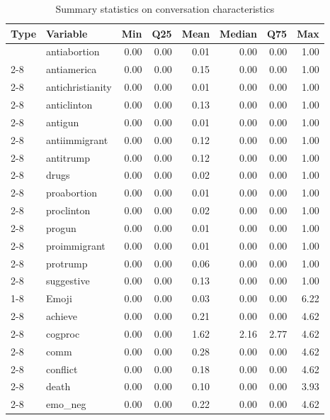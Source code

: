 \documentclass{article}
\begin{document}
\begin{table}[h]
\centering
\caption{\label{tab:summ-tab2}Summary statistics on conversation characteristics}
\centering
\begin{tabular}[t]{l|l|r|r|r|r|r|r}
\hline
Type & Variable & Min & Q25 & Mean & Median & Q75 & Max\\
\hline
 & antiabortion & 0.00 & 0.00 & 0.01 & 0.00 & 0.00 & 1.00\\
\cline{2-8}
 & antiamerica & 0.00 & 0.00 & 0.15 & 0.00 & 0.00 & 1.00\\
\cline{2-8}
 & antichristianity & 0.00 & 0.00 & 0.01 & 0.00 & 0.00 & 1.00\\
\cline{2-8}
 & anticlinton & 0.00 & 0.00 & 0.13 & 0.00 & 0.00 & 1.00\\
\cline{2-8}
 & antigun & 0.00 & 0.00 & 0.01 & 0.00 & 0.00 & 1.00\\
\cline{2-8}
 & antiimmigrant & 0.00 & 0.00 & 0.12 & 0.00 & 0.00 & 1.00\\
\cline{2-8}
 & antitrump & 0.00 & 0.00 & 0.12 & 0.00 & 0.00 & 1.00\\
\cline{2-8}
 & drugs & 0.00 & 0.00 & 0.02 & 0.00 & 0.00 & 1.00\\
\cline{2-8}
 & proabortion & 0.00 & 0.00 & 0.01 & 0.00 & 0.00 & 1.00\\
\cline{2-8}
 & proclinton & 0.00 & 0.00 & 0.02 & 0.00 & 0.00 & 1.00\\
\cline{2-8}
 & progun & 0.00 & 0.00 & 0.01 & 0.00 & 0.00 & 1.00\\
\cline{2-8}
 & proimmigrant & 0.00 & 0.00 & 0.01 & 0.00 & 0.00 & 1.00\\
\cline{2-8}
 & protrump & 0.00 & 0.00 & 0.06 & 0.00 & 0.00 & 1.00\\
\cline{2-8}
\multirow{\raggedright\arraybackslash Topic} & suggestive & 0.00 & 0.00 & 0.13 & 0.00 & 0.00 & 1.00\\
\cline{1-8}
 & Emoji & 0.00 & 0.00 & 0.03 & 0.00 & 0.00 & 6.22\\
\cline{2-8}
 & achieve & 0.00 & 0.00 & 0.21 & 0.00 & 0.00 & 4.62\\
\cline{2-8}
 & cogproc & 0.00 & 0.00 & 1.62 & 2.16 & 2.77 & 4.62\\
\cline{2-8}
 & comm & 0.00 & 0.00 & 0.28 & 0.00 & 0.00 & 4.62\\
\cline{2-8}
 & conflict & 0.00 & 0.00 & 0.18 & 0.00 & 0.00 & 4.62\\
\cline{2-8}
 & death & 0.00 & 0.00 & 0.10 & 0.00 & 0.00 & 3.93\\
\cline{2-8}
 & emo\_neg & 0.00 & 0.00 & 0.22 & 0.00 & 0.00 & 4.62\\

\end{tabular}
\end{table}
\end{document}
